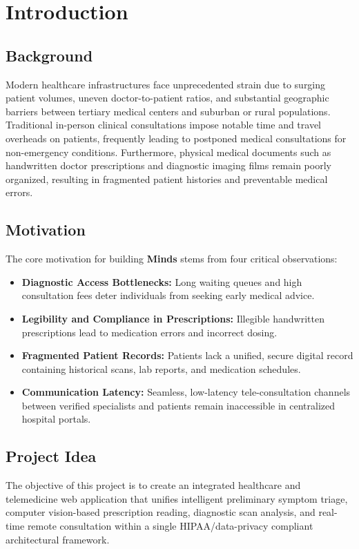 \documentclass[12pt,a4paper]{report}
\begin{document}
\chapter{Introduction}

\section{Background}
Modern healthcare infrastructures face unprecedented strain due to surging patient volumes, uneven doctor-to-patient ratios, and substantial geographic barriers between tertiary medical centers and suburban or rural populations. Traditional in-person clinical consultations impose notable time and travel overheads on patients, frequently leading to postponed medical consultations for non-emergency conditions. Furthermore, physical medical documents such as handwritten doctor prescriptions and diagnostic imaging films remain poorly organized, resulting in fragmented patient histories and preventable medical errors.

\section{Motivation}
The core motivation for building \textbf{Minds} stems from four critical observations:
\begin{itemize}[leftmargin=1.5cm]
    \item \textbf{Diagnostic Access Bottlenecks:} Long waiting queues and high consultation fees deter individuals from seeking early medical advice.
    \item \textbf{Legibility and Compliance in Prescriptions:} Illegible handwritten prescriptions lead to medication errors and incorrect dosing.
    \item \textbf{Fragmented Patient Records:} Patients lack a unified, secure digital record containing historical scans, lab reports, and medication schedules.
    \item \textbf{Communication Latency:} Seamless, low-latency tele-consultation channels between verified specialists and patients remain inaccessible in centralized hospital portals.
\end{itemize}

\section{Project Idea}
The objective of this project is to create an integrated healthcare and telemedicine web application that unifies intelligent preliminary symptom triage, computer vision-based prescription reading, diagnostic scan analysis, and real-time remote consultation within a single HIPAA/data-privacy compliant architectural framework.
\end{document}
